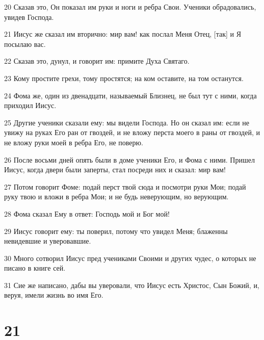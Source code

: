 \par 20 Сказав это, Он показал им руки и ноги и ребра Свои. Ученики обрадовались, увидев Господа.
\par 21 Иисус же сказал им вторично: мир вам! как послал Меня Отец, [так] и Я посылаю вас.
\par 22 Сказав это, дунул, и говорит им: примите Духа Святаго.
\par 23 Кому простите грехи, тому простятся; на ком оставите, на том останутся.
\par 24 Фома же, один из двенадцати, называемый Близнец, не был тут с ними, когда приходил Иисус.
\par 25 Другие ученики сказали ему: мы видели Господа. Но он сказал им: если не увижу на руках Его ран от гвоздей, и не вложу перста моего в раны от гвоздей, и не вложу руки моей в ребра Его, не поверю.
\par 26 После восьми дней опять были в доме ученики Его, и Фома с ними. Пришел Иисус, когда двери были заперты, стал посреди них и сказал: мир вам!
\par 27 Потом говорит Фоме: подай перст твой сюда и посмотри руки Мои; подай руку твою и вложи в ребра Мои; и не будь неверующим, но верующим.
\par 28 Фома сказал Ему в ответ: Господь мой и Бог мой!
\par 29 Иисус говорит ему: ты поверил, потому что увидел Меня; блаженны невидевшие и уверовавшие.
\par 30 Много сотворил Иисус пред учениками Своими и других чудес, о которых не писано в книге сей.
\par 31 Сие же написано, дабы вы уверовали, что Иисус есть Христос, Сын Божий, и, веруя, имели жизнь во имя Его.

\chapter{21}

